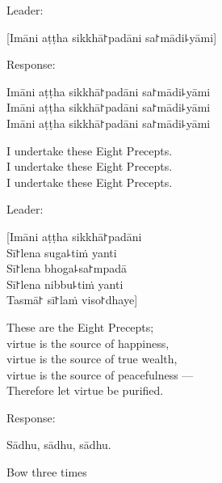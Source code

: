 \begin{instruction}
  Leader:
\end{instruction}

[Imāni aṭṭha sikkhā꜓padāni sa꜓mādi꜕yāmi]

\begin{instruction}
  Response:
\end{instruction}

\clearpage

Imāni aṭṭha sikkhā꜓padāni sa꜓mādi꜕yāmi\\
Imāni aṭṭha sikkhā꜓padāni sa꜓mādi꜕yāmi\\
Imāni aṭṭha sikkhā꜓padāni sa꜓mādi꜕yāmi

\begin{english}
  I undertake these Eight Precepts.\\
  I undertake these Eight Precepts.\\
  I undertake these Eight Precepts.
\end{english}

\begin{instruction}
  Leader:
\end{instruction}

[Imāni aṭṭha sikkhā꜓padāni\\
Sī꜓lena suga꜕tiṁ yanti\\
Sī꜓lena bhoga꜕sa꜓mpadā\\
Sī꜓lena nibbu꜕tiṁ yanti\\
Tasmā꜓ sī꜓laṁ viso꜓dhaye]

\begin{english}
  These are the Eight Precepts;\\
  virtue is the source of happiness,\\
  virtue is the source of true wealth,\\
  virtue is the source of peacefulness ---\\
  Therefore let virtue be purified.
\end{english}

\begin{instruction}
  Response:
\end{instruction}

Sādhu, sādhu, sādhu.

\begin{instruction}
  Bow three times
\end{instruction}

